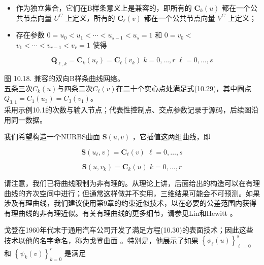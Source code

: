 \documentclass[../main.tex]{subfiles}
\begin{document}
\begin{itemize}
\item 作为独立集合，它们在B样条意义上是兼容的，即所有的 \({\mathbf{C}}_{k}\left( u\right)\) 都在一个公共节点向量 \({U}^{C}\) 上定义，所有的 \({\mathbf{C}}_{\ell }\left( v\right)\) 都在一个公共节点向量 \({V}^{C}\) 上定义；
\end{itemize}

\begin{itemize}
\item 存在参数 \(0 = {u}_{0} < {u}_{1} < \cdots  < {u}_{s - 1} < {u}_{s} = 1\) 和 \(0 = {v}_{0} <\)  \({v}_{1} < \cdots  < {v}_{r - 1} < {v}_{r} = 1\) 使得
\end{itemize}

\[
{\mathbf{Q}}_{\ell ,k} = {\mathbf{C}}_{k}\left( {u}_{\ell }\right)  = {\mathbf{C}}_{\ell }\left( {v}_{k}\right) \;k = 0,\ldots ,r\;\ell  = 0,\ldots ,s \tag{10.29}
\]

\begin{center}
\begin{minipage}{24cm}
\centering
{}
\par\smallskip
图 10.18. 兼容的双向B样条曲线网络。\\
五条三次$C_k(u)$与四条二次$C_\ell(v)$在二十个实心点处满足式(10.29)，其中圈点$Q_{3,1}=C_1(u_3)=C_3(v_1)$。\\
采用示例10.1的次数与输入节点；代表性控制点、交点参数记录于源码，后续图沿用同一数据。
\end{minipage}
\end{center}

我们希望构造一个NURBS曲面 \(\mathbf{S}\left( {u,v}\right)\) ，它插值这两组曲线，即

\[
\mathbf{S}\left( {{u}_{\ell },v}\right)  = {\mathbf{C}}_{\ell }\left( v\right) \;\ell  = 0,\ldots ,s
\]

\[
\mathbf{S}\left( {u,{v}_{k}}\right)  = {\mathbf{C}}_{k}\left( u\right) \;k = 0,\ldots ,r \tag{10.30}
\]

请注意，我们已将曲线限制为非有理的。从理论上讲，后面给出的构造可以在有理曲线的齐次空间中进行；但通常这样做并不实用，三维结果可能会不可预测。如果涉及有理曲线，我们建议使用第9章的约束近似技术，以在必要的公差范围内获得有理曲线的非有理近似。有关有理曲线的更多细节，请参见Lin和Hewitt \cite{Lin94}。

戈登在1960年代末于通用汽车公司开发了满足方程(10.30)的表面技术；因此这些技术以他的名字命名，称为戈登曲面 \cite{Gord69,Gord71,Gord93}。特别是，他展示了如果 \({\left\{  {\phi }_{\ell }\left( u\right) \right\}  }_{\ell  = 0}^{s}\) 和 \({\left\{  {\psi }_{k}\left( v\right) \right\}  }_{k = 0}^{r}\) 是满足
\end{document}
